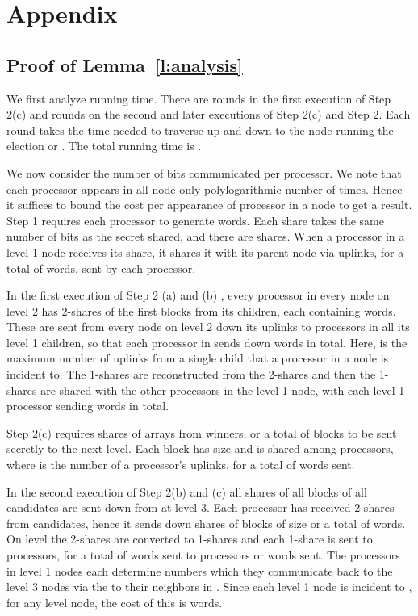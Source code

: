 \documentclass[letterpaper,11pt]{article}
\newcommand{\sq}{\hbox{\rlap{}}}
\newcommand{\qed}{\hspace*{\fill}\sq}
\newenvironment{proof}{\noindent {\bf Proof:}}{\qed\par\vskip 4mm\par}
\begin{document}



\appendix

\section{Appendix}

\subsection{Proof of Lemma~\ref{l:analysis}} \label{s:pf-analysis}

\begin{proof}
We first analyze running time. There are   rounds in the first execution of  Step 2(c)  and  rounds on the second and later executions of
Step 2(c) and Step 2.  Each round takes the time needed to traverse up and down to the node running the election or . 
The total running time is .

We now consider the number of bits communicated per processor. We note that each processor appears in all node only polylogarithmic number of times. Hence it suffices to bound the cost per appearance of processor in a node to get  a  result. 
Step 1 requires each processor to  generate   words. Each share takes the same number of bits as the secret shared,  and there are
 shares. When a processor in a level 1 node receives its share,  it  shares it with its parent node via  uplinks, for a total of  words.  sent by each processor. 

In the first execution of Step 2 (a) and (b) , every processor in every node  on level 2 has  2-shares of the  first blocks from its children, each containing  words. These are  sent from every node  on level 2 down its uplinks
to processors in all its  level 1 children,  so that each processor in   sends down  words in total. Here,  is the maximum number of uplinks from a single child that a processor in a node is incident to. The 1-shares are reconstructed from the 2-shares and then the 1-shares are shared with the other processors in the level 1 node, with each level 1 processor sending  words in total. 

 Step 2(c) requires  shares of arrays from  winners, or a total of  blocks to be sent secretly to the next level.  Each block has size  and is shared among  processors, where  is the number of a processor's uplinks. 
 for a total of  words sent. 
 
In the second execution of Step 2(b) and (c) all shares of all  blocks of all  candidates are sent down from  at level 3.  Each processor has received 
2-shares from   candidates, hence it sends down  shares of blocks of size  or  a total of 
words.
On level  the 2-shares are converted to 1-shares and each 1-share is sent to  processors, for a total of  words sent to  processors or
 words sent. 
The processors in level 1 nodes each determine  numbers which they communicate back to the level 3 nodes via the  to their neighbors in .
Since each level 1 node is incident to   , for any level  node, the cost of this is  words.



\end{proof}
\end{document}
